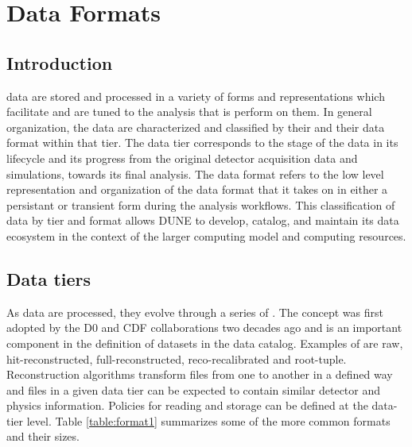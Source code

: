 \documentclass[../main-v1.tex]{subfiles}
\begin{document}
\chapter{Data Formats}
\label{ch:format}

\section{Introduction } 

 data are stored and processed in a variety of forms and representations which facilitate and are tuned to the analysis that is perform on them.   In general organization, the data are characterized and classified by their  and their data format within that tier.  The data tier corresponds to the stage of the data in its lifecycle and its progress from the original detector acquisition data and simulations, towards its final analysis.  The data format refers to the low level representation and organization of the data format that it takes on in either a persistant or transient form during the analysis workflows.  This classification of data by tier and format allows DUNE to develop, catalog, and maintain its data ecosystem in the context of the larger computing model and computing resources.


\section{Data tiers }

As data are processed, they evolve through a series of .  The  concept was first adopted by the D0 and CDF collaborations two decades ago and is an important component in the definition of datasets in the data catalog.   Examples of  are raw, hit-reconstructed, full-reconstructed, reco-recalibrated and root-tuple. 
Reconstruction algorithms transform files from one  to another in a defined way and files in a given data tier can be expected to contain similar detector and physics information.   
Policies for reading and storage can be defined at the data-tier level. 
Table \ref{table:format1} summarizes some of the more common formats and their sizes. 
\end{document}
